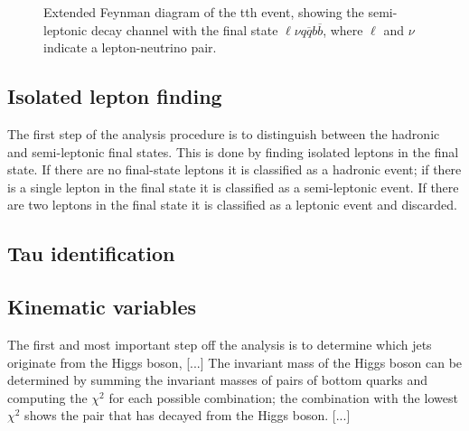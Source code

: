 \begin{figure}
	\caption{Extended Feynman diagram of the tth event, showing the semi-leptonic decay channel  with the final state $\ell\nu q\overline{q}b\overline{b}$, where $\ell$ and $\nu$ indicate a lepton-neutrino pair.}
	\label{figure:physics/SM/feynman-tth-semileptonic}
\end{figure}

\subsection{Isolated lepton finding}
The first step of the analysis procedure is to distinguish between the hadronic and semi-leptonic final states. This is done by finding isolated leptons in the final state. If there are no final-state leptons it is classified as a hadronic event; if there is a single lepton in the final state it is classified as a semi-leptonic event. If there are two leptons in the final state it is classified as a leptonic event and discarded.


\subsection{Tau identification}

\subsection{Kinematic variables}

The first and most important step off the analysis is to determine which jets originate from the Higgs boson, [...] The invariant mass of the Higgs boson can be determined by summing the invariant masses of pairs of bottom quarks and computing the $\chi^2$ for each possible combination; the combination with the lowest $\chi^2$ shows the pair that has decayed from the Higgs boson. [...]

